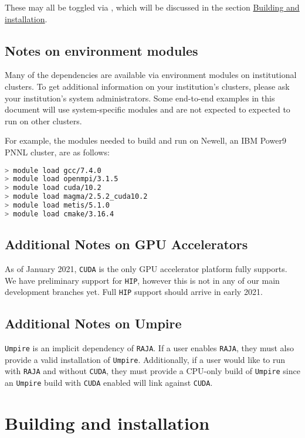These may all be toggled via \cmake, which will be discussed in the section \hyperref[sec:building_and_installation]{Building and installation}.

\subsection{Notes on environment modules}

Many of the dependencies are available via environment modules on institutional clusters.
To get additional information on your institution's clusters, please ask your institution's system administrators.
Some end-to-end examples in this document will use system-specific modules and are not expected to expected to run on other clusters.

For example, the modules needed to build and run \exago on Newell, an IBM Power9 PNNL cluster, are as follows:

\begin{lstlisting}[language=bash]
> module load gcc/7.4.0
> module load openmpi/3.1.5
> module load cuda/10.2
> module load magma/2.5.2_cuda10.2
> module load metis/5.1.0
> module load cmake/3.16.4
\end{lstlisting}

\subsection{Additional Notes on GPU Accelerators}

As of January 2021, \texttt{CUDA} is the only GPU accelerator platform \exago fully supports.
We have preliminary support for \texttt{HIP}, however this is not in any of our main development branches yet.
Full \texttt{HIP} support should arrive in early 2021.

\subsection{Additional Notes on Umpire}

\texttt{Umpire} is an implicit dependency of \texttt{RAJA}.
If a user enables \texttt{RAJA}, they must also provide a valid installation of \texttt{Umpire}.
Additionally, if a user would like to run \exago with \texttt{RAJA} and without \texttt{CUDA}, they must provide a CPU-only build of \texttt{Umpire} since an \texttt{Umpire} build with \texttt{CUDA} enabled will link against \texttt{CUDA}.

\section{Building and installation}
\label{sec:building_and_installation}

